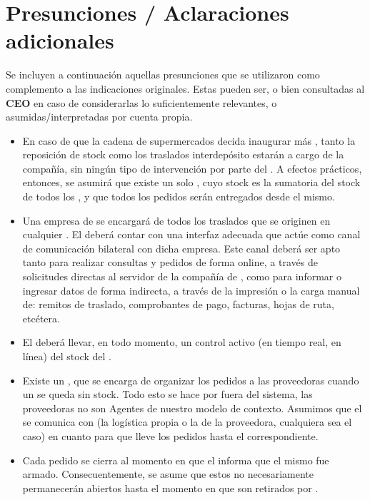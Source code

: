 
\section{Presunciones / Aclaraciones adicionales}

Se incluyen a continuación aquellas presunciones que se utilizaron como
complemento a las indicaciones originales. Estas pueden ser, o bien consultadas
al \textbf{CEO} en caso de considerarlas lo suficientemente relevantes, o
asumidas/interpretadas por cuenta propia.

\begin{itemize}

  \item En caso de que la cadena de supermercados decida inaugurar más
\textbf{}, tanto la reposición de stock como los traslados
interdepósito estarán a cargo de la compañía, sin ningún tipo de intervención
por parte del \textbf{}. A efectos prácticos, entonces, se asumirá
que existe un solo \textbf{}, cuyo stock es la sumatoria del stock
de todos los \textbf{}, y que todos los pedidos serán entregados
desde el mismo.

  \item Una empresa de \textbf{} se encargará de todos los
traslados que se originen en cualquier \textbf{}. El
\textbf{} deberá contar con una interfaz adecuada que actúe como
canal de comunicación bilateral con dicha empresa. Este canal deberá ser apto
tanto para realizar consultas y pedidos de forma online, a través de solicitudes
directas al servidor de la compañía de \textbf{}, como para
informar o ingresar datos de forma indirecta, a través de la impresión o la
carga manual de: remitos de traslado, comprobantes de pago, facturas, hojas de
ruta, etcétera.

  \item El \textbf{} deberá llevar, en todo momento, un control
activo (en tiempo real, en línea) del stock del \textbf{}.

  \item Existe un \textbf{}, que se encarga de
organizar los pedidos a las proveedoras cuando un \textbf{} se
queda sin stock. Todo esto se hace por fuera del sistema, las proveedoras no son
Agentes de nuestro modelo de contexto. Asumimos que el
\textbf{} se comunica con \textbf{}
(la logística propia o la de la proveedora, cualquiera sea el caso) en cuanto
para que lleve los pedidos hasta el \textbf{} correspondiente.

  \item Cada pedido se cierra al momento en que el \textbf{}
informa que el mismo fue armado. Consecuentemente, se asume que estos no
necesariamente permanecerán abiertos hasta el momento en que son retirados por
\textbf{}.

\end{itemize}
